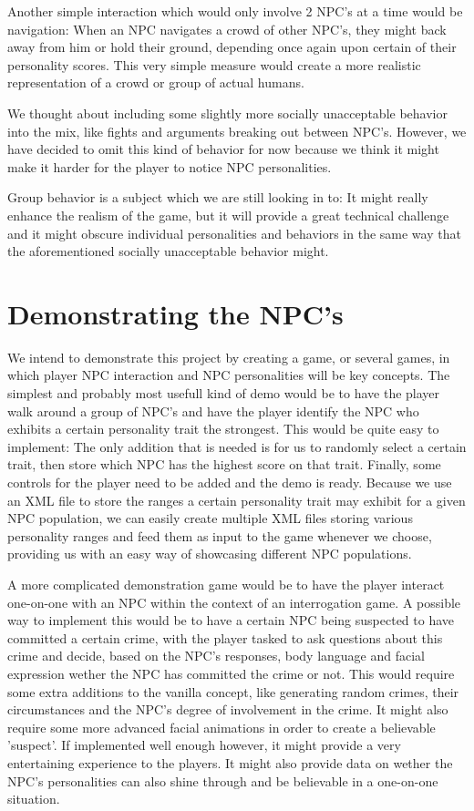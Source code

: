 \documentclass{article}
\begin{document}
	Another simple interaction which would only involve 2 NPC's at a time would be navigation: When an NPC navigates a crowd of other NPC's, they might back away from him or hold their   ground, depending once again upon certain of their personality scores. This very simple measure would create a more realistic representation of a crowd or group of actual humans.

We thought about including some slightly more socially unacceptable behavior into the mix, like fights and arguments breaking out between NPC's. However, we have decided to omit this kind of behavior for now because we think it might make it harder for the player to notice NPC personalities.

Group behavior is a subject which we are still looking in to: It might really enhance the realism of the game, but it will provide a great technical challenge and it might obscure individual personalities and behaviors in the same way that the aforementioned socially unacceptable behavior might.


	\newpage
	\section{Demonstrating the NPC's}
	 We intend to demonstrate this project by creating a game, or several games, in which player NPC interaction and NPC personalities will be key concepts. The simplest and probably most usefull kind of demo would be to have the player walk around a group of NPC's and have the player identify the NPC who exhibits a certain personality trait the strongest. This would be quite easy to implement: The only addition that is needed is for us to randomly select a certain trait, then store which NPC has the highest score on that trait. Finally, some controls for the player need to be added and the demo is ready. Because we use an XML file to store the ranges a certain personality trait may exhibit for a given NPC population, we can easily create multiple XML files storing various personality ranges and feed them as input to the game whenever we choose, providing us with an easy way of showcasing different NPC populations.

A more complicated demonstration game would be to have the player interact one-on-one with an NPC within the context of an interrogation game. A possible way to implement this would be to have a certain NPC being suspected to have committed a certain crime, with the player tasked to ask questions about this crime and decide, based on the NPC's responses, body language and facial expression wether the NPC has committed the crime or not. This would require some extra additions to the vanilla concept, like generating random crimes, their circumstances and the NPC's degree of involvement in the crime. It might also require some more advanced facial animations in order to create a believable 'suspect'. If implemented well enough however, it might provide a very entertaining experience to the players. It might also provide data on wether the NPC's personalities can also shine through and be believable in a one-on-one situation.
\end{document}
